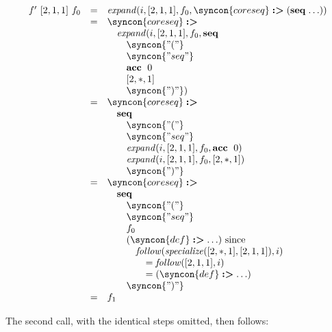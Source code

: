 \documentclass{kththesis}
\begin{document}
$$
\begin{array}{rcl}
f'~[2, 1, 1]~f_0 & = & \expand(i, [2, 1, 1], f_0, \syncon{coreseq} \tagged (\seq \ldots)) \\
& = & \syncon{coreseq} \tagged \\
& & \quad \expand(i, [2, 1, 1], f_0, \seq \\
& & \qquad \syncon{"("} \\
& & \qquad \syncon{"seq"} \\
& & \qquad \acc~0 \\
& & \qquad [2, *, 1] \\
& & \qquad \syncon{")"}) \\
& = & \syncon{coreseq} \tagged \\
& & \quad \seq \\
& & \qquad \syncon{"("} \\
& & \qquad \syncon{"seq"} \\
& & \qquad \expand(i, [2, 1, 1], f_0, \acc~0) \\
& & \qquad \expand(i, [2, 1, 1], f_0, [2, *, 1]) \\
& & \qquad \syncon{")"} \\
& = & \syncon{coreseq} \tagged \\
& & \quad \seq \\
& & \qquad \syncon{"("} \\
& & \qquad \syncon{"seq"} \\
& & \qquad f_0 \\
& & \qquad (\syncon{def} \tagged \ldots) \text{ since} \\
& & \qquad \quad \follow(\specialize([2, *, 1], [2, 1, 1]), i) \\
& & \qquad \qquad = \follow([2, 1, 1], i) \\
& & \qquad \qquad = (\syncon{def} \tagged \ldots) \\
& & \qquad \syncon{")"} \\
& = & f_1 \\
\end{array}
$$

The second call, with the identical steps omitted, then follows:
\end{document}
